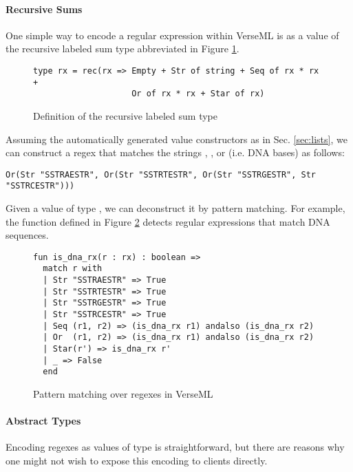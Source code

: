 \paragraph{Recursive Sums}
One simple way to encode a regular expression within VerseML is as a value of the recursive labeled sum type abbreviated  in Figure \ref{fig:datatype-rx}.

\begin{figure}[ht]
\begin{lstlisting}[numbers=none]
type rx = rec(rx => Empty + Str of string + Seq of rx * rx +
                    Or of rx * rx + Star of rx)
\end{lstlisting}
\caption{Definition of the recursive labeled sum type }
\label{fig:datatype-rx}
\end{figure}
Assuming the automatically generated value constructors as in Sec. \ref{sec:lists}, we can construct a regex that matches the strings , ,  or  (i.e. DNA bases) as follows:
\begin{lstlisting}[numbers=none]
Or(Str "SSTRAESTR", Or(Str "SSTRTESTR", Or(Str "SSTRGESTR", Str "SSTRCESTR")))
\end{lstlisting}

Given a value of type , we can deconstruct it by pattern matching. For example, the function  defined in Figure \ref{fig:is_dna_rx} detects regular expressions that match DNA sequences.

\begin{figure}[h]
\begin{lstlisting}[numbers=none]
fun is_dna_rx(r : rx) : boolean => 
  match r with 
  | Str "SSTRAESTR" => True
  | Str "SSTRTESTR" => True
  | Str "SSTRGESTR" => True
  | Str "SSTRCESTR" => True
  | Seq (r1, r2) => (is_dna_rx r1) andalso (is_dna_rx r2)
  | Or  (r1, r2) => (is_dna_rx r1) andalso (is_dna_rx r2)
  | Star(r') => is_dna_rx r'
  | _ => False 
  end
\end{lstlisting}
\caption{Pattern matching over regexes in VerseML}
\label{fig:is_dna_rx}
\end{figure}


\paragraph{Abstract Types} Encoding regexes as values of type  is straightforward, but there are reasons why one might not wish to expose this encoding to clients directly. 

